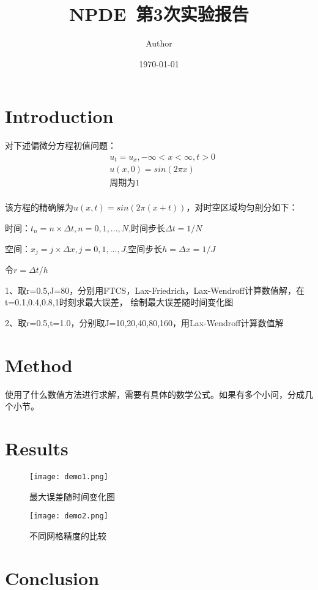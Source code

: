 \documentclass{article}
\title{NPDE~第3次实验报告}
\author{Author}
\date{\today}
\begin{document}
\maketitle

\section{Introduction}

对下述偏微分方程初值问题：
$$
\begin{aligned}
    &u_t=u_x,-\infty<x<\infty,t>0\\
    &u(x,0)=sin(2\pi x)\\
    &\text{周期为1}\\
\end{aligned}
$$

该方程的精确解为$u(x,t)=sin(2\pi(x+t))$，对时空区域均匀剖分如下：

时间：$t_n=n\times \Delta t,n=0,1,...,N$,时间步长$\Delta t=1/N$

空间：$x_j=j\times \Delta x,j=0,1,...,J$,空间步长$h=\Delta x=1/J$

令$r=\Delta t/h$

1、取r=0.5,J=80，分别用FTCS，Lax-Friedrich，Lax-Wendroff计算数值解，在t=0.1,0.4,0.8,1时刻求最大误差，
绘制最大误差随时间变化图

2、取r=0.5,t=1.0，分别取J=10,20,40,80,160，用Lax-Wendroff计算数值解
\section{Method}

使用了什么数值方法进行求解，需要有具体的数学公式。如果有多个小问，分成几个小节。


\section{Results}

\begin{figure}[H]
    \centering
    \texttt{[image: demo1.png]}
    \caption{最大误差随时间变化图}\label{fig:demo1}
\end{figure}

\begin{figure}[H]
    \centering
    \texttt{[image: demo2.png]}
    \caption{不同网格精度的比较}\label{fig:demo2}
\end{figure}

\section{Conclusion}
\end{document}

